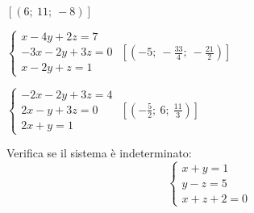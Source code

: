 \begin{esercizio}[\Ast]
\begin{multicols}{2}
\begin{enumeratea}
 \hfill \(\left[(6;~11;~-8)\right]\)
\item \(\left\{\begin{array}{l}x-4y+2z=7 \\-3x-2y+3z=0 \\x-2y+z=1 
\end{array}\right.\)
 \hfill \(\left[\left(-5;~-\frac{33}{4};~-\frac{21}{2}\right)\right]\)
\item \(\left\{\begin{array}{l}-2x-2y+3z=4 \\2x-y+3z=0\\2x+y=1 
\end{array}\right.\)
 \hfill \(\left[\left(-{\frac{5}{2}};~6;~\frac{11}{3}\right)\right]\)
\end{enumeratea}
\end{multicols}
\end{esercizio}

% 

\begin{esercizio}
 \label{ese:22.62}
Verifica se il sistema è indeterminato:
\[\left\{\begin{array}{l}x+y=1 \\y-z=5
\\x+z+2=0 \end{array}\right.\]
\end{esercizio}

